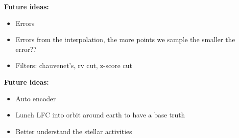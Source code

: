 \textbf{Future ideas:}
\begin{itemize}
    \item Errors
    \item Errors from the interpolation, the more points we sample the smaller the error??
    \item Filters: chauvenet's, rv cut, z-score cut
\end{itemize}


\textbf{Future ideas:}
\begin{itemize}
    \item Auto encoder
    \item Lunch LFC into orbit around earth to have a base truth
    \item Better understand the stellar activities
\end{itemize}